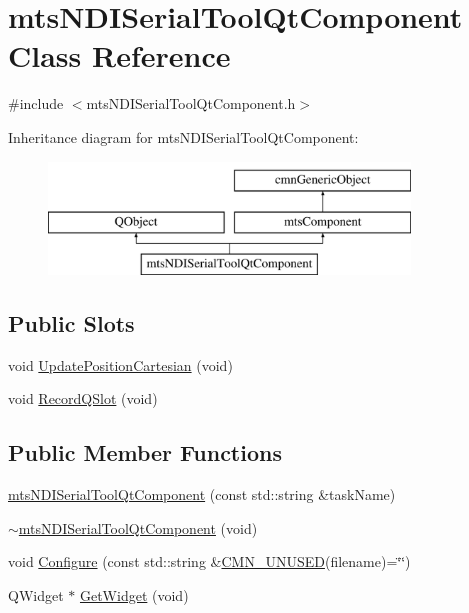 \hypertarget{classmts_n_d_i_serial_tool_qt_component}{\section{mts\-N\-D\-I\-Serial\-Tool\-Qt\-Component Class Reference}
\label{classmts_n_d_i_serial_tool_qt_component}
}


{\ttfamily \#include $<$mts\-N\-D\-I\-Serial\-Tool\-Qt\-Component.\-h$>$}

Inheritance diagram for mts\-N\-D\-I\-Serial\-Tool\-Qt\-Component\-:\begin{figure}[H]
\begin{center}
\leavevmode
\includegraphics[height=3.000000cm]{dc/d97/classmts_n_d_i_serial_tool_qt_component}
\end{center}
\end{figure}
\subsection*{Public Slots}
\begin{DoxyCompactItemize}
\item 
void \hyperlink{classmts_n_d_i_serial_tool_qt_component_a9bc1bd4a013f0635d0b7f353866a2f0f}{Update\-Position\-Cartesian} (void)
\item 
void \hyperlink{classmts_n_d_i_serial_tool_qt_component_a91030077c7e421792da63ee60d57987f}{Record\-Q\-Slot} (void)
\end{DoxyCompactItemize}
\subsection*{Public Member Functions}
\begin{DoxyCompactItemize}
\item 
\hyperlink{classmts_n_d_i_serial_tool_qt_component_a936a395717f665487020236f9937fe89}{mts\-N\-D\-I\-Serial\-Tool\-Qt\-Component} (const std\-::string \&task\-Name)
\item 
\hyperlink{classmts_n_d_i_serial_tool_qt_component_a15ac6f59c33f4a578a047dab9a2fb2ed}{$\sim$mts\-N\-D\-I\-Serial\-Tool\-Qt\-Component} (void)
\item 
void \hyperlink{classmts_n_d_i_serial_tool_qt_component_a8e422967c0f7a50a5c912c5b1fdf94d0}{Configure} (const std\-::string \&\hyperlink{cmn_portability_8h_a021894e2626935fa2305434b1e893ff6}{C\-M\-N\-\_\-\-U\-N\-U\-S\-E\-D}(filename)=\char`\"{}\char`\"{})
\item 
Q\-Widget $\ast$ \hyperlink{classmts_n_d_i_serial_tool_qt_component_afa66d85f0d5b76b7fb5741b8e958eed5}{Get\-Widget} (void)
\end{DoxyCompactItemize}

